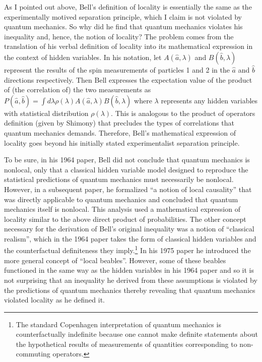 \documentclass[12pt]{article}
\begin{document}
As I pointed out above, Bell's definition of locality is essentially the same as the experimentally motived separation principle, which I claim is not violated by quantum mechanics.  So why did he find that quantum mechanics violates his inequality and, hence, the notion of locality?  The problem comes from the translation of his verbal definition of locality into its mathematical expression in the context of hidden variables.  In his notation, let $A(\hat{a},\lambda)$ and $B(\hat{b},\lambda)$ represent the results of the spin measurements of particles 1 and 2 in the $\hat{a}$ and $\hat{b}$ directions respectively.  Then Bell expresses the expectation value of the product of (the correlation of) the two measurements as $P(\hat{a},\hat{b}) = \int d\lambda \rho(\lambda)A(\hat{a},\lambda)B(\hat{b},\lambda)$ where $\lambda$ represents any hidden variables with statistical distribution $\rho(\lambda)$.  This is analogous to the product of operators definition (given by Shimony) that precludes the types of correlations that quantum mechanics demands.  Therefore, Bell's mathematical expression of locality goes beyond his initially stated experimentalist separation principle.

To be sure, in his 1964 paper, Bell did not conclude that quantum mechanics is nonlocal, only that a classical hidden variable model designed to reproduce the statistical predictions of quantum mechanics must necessarily be nonlocal.  However, in a subsequent paper\cite{Bel75}, he formalized ``a notion of local causality'' that was directly applicable to quantum mechanics and concluded that quantum mechanics itself is nonlocal.  This analysis used a mathematical expression of locality similar to the above direct product of probabilities. The other concept necessary for the derivation of Bell's original inequality was a notion of ``classical realism'', which in the 1964 paper takes the form of classical hidden variables and the counterfactual definiteness they imply.\footnote{The standard Copenhagen interpretation of quantum mechanics is counterfactually indefinite because one cannot make definite statements about the hypothetical results of measurements of quantities corresponding to non-commuting operators.} In his 1975 paper he introduced the more general concept of ``local beables''.  However, some of these beables functioned in the same way as the hidden variables in his 1964 paper and so it is not surprising that an inequality he derived from these assumptions is violated by the predictions of quantum mechanics thereby revealing that quantum mechanics violated locality as he defined it.
\end{document}

